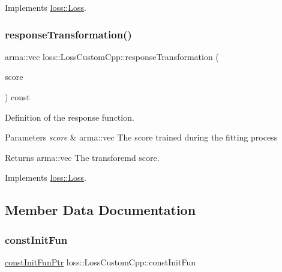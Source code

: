 Implements \hyperlink{classloss_1_1_loss_ae9f94dd9b8311397583ba3a9cb485e94}{loss\+::\+Loss}.

\mbox{\label{classloss_1_1_loss_custom_cpp_ace7a23f6b0da58d12f1dec29e26acf18}} 
\subsubsection{\texorpdfstring{response\+Transformation()}{responseTransformation()}}
{\footnotesize\ttfamily arma\+::vec loss\+::\+Loss\+Custom\+Cpp\+::response\+Transformation (\begin{DoxyParamCaption}\item[{const arma\+::vec \&}]{score }\end{DoxyParamCaption}) const\hspace{0.3cm}{\ttfamily [virtual]}}



Definition of the response function. 


\begin{DoxyParams}{Parameters}
{\em score} & {\ttfamily arma\+::vec} The score trained during the fitting process\\
\hline
\end{DoxyParams}
\begin{DoxyReturn}{Returns}
{\ttfamily arma\+::vec} The transforemd score. 
\end{DoxyReturn}


Implements \hyperlink{classloss_1_1_loss_a0a84b7df79b08e40b538aaa7e6ee75c4}{loss\+::\+Loss}.



\subsection{Member Data Documentation}
\mbox{\label{classloss_1_1_loss_custom_cpp_a444ea8e5947d242cb774418cb0f3bc51}} 
\subsubsection{\texorpdfstring{const\+Init\+Fun}{constInitFun}}
{\footnotesize\ttfamily \hyperlink{namespaceloss_af21a5d5ed7431ecbc73730ce2bde3987}{const\+Init\+Fun\+Ptr} loss\+::\+Loss\+Custom\+Cpp\+::const\+Init\+Fun\hspace{0.3cm}{\ttfamily [private]}}




